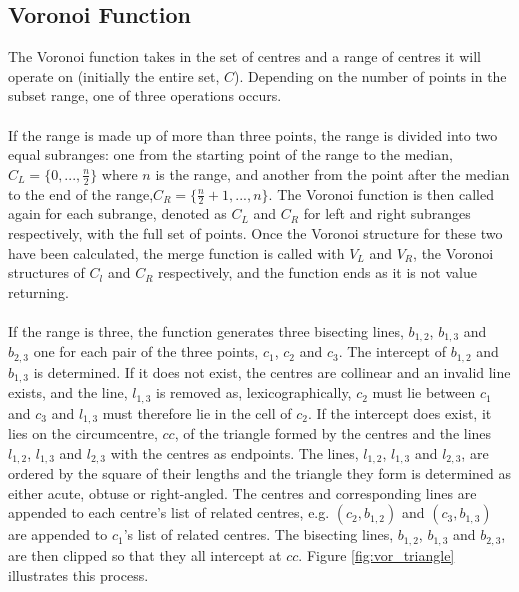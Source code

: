 \subsection{Voronoi Function}
The Voronoi function takes in the set of centres and a range of centres it will operate on (initially the entire set, $C$). Depending on the number of points in the subset range, one of three operations occurs.
\\
\\
If the range is made up of more than three points, the range is divided into two equal subranges: one from the starting point of the range to the median, $C_L = \{0,...,\frac{n}{2}\}$ where $n$ is the range, and another from the point after the median to the end of the range,$C_R = \{\frac{n}{2}+1,...,n\}$. The Voronoi function is then called again for each subrange, denoted as $C_L$ and $C_R$ for left and right subranges respectively, with the full set of points. Once the Voronoi structure for these two have been calculated, the merge function is called with $V_L$ and $V_R$, the Voronoi structures of $C_l$ and $C_R$ respectively, and the function ends as it is not value returning.
\\
\\
If the range is three, the function generates three bisecting lines, $b_{1,2}$, $b_{1,3}$ and $b_{2,3}$ one for each pair of the three points, $c_1$, $c_2$ and $c_3$. The intercept of $b_{1,2}$ and $b_{1,3}$ is determined. If it does not exist, the centres are collinear and an invalid line exists, and the line, $l_{1,3}$ is removed as, lexicographically, $c_2$ must lie between $c_1$ and $c_3$ and $l_{1,3}$ must therefore lie in the cell of $c_2$. If the intercept does exist, it lies on the circumcentre, $cc$, of the triangle formed by the centres and the lines $l_{1,2}$, $l_{1,3}$ and $l_{2,3}$ with the centres as endpoints. The lines, $l_{1,2}$, $l_{1,3}$ and $l_{2,3}$, are ordered by the square of their lengths and the triangle they form is determined as either acute, obtuse or right-angled. The centres and corresponding lines are appended to each centre's list of related centres, e.g. $(c_2,b_{1,2})$ and $(c_3,b_{1,3})$ are appended to $c_1$'s list of related centres. The bisecting lines, $b_{1,2}$, $b_{1,3}$ and $b_{2,3}$, are then clipped so that they all intercept at $cc$. Figure \ref{fig:vor_triangle} illustrates this process.
